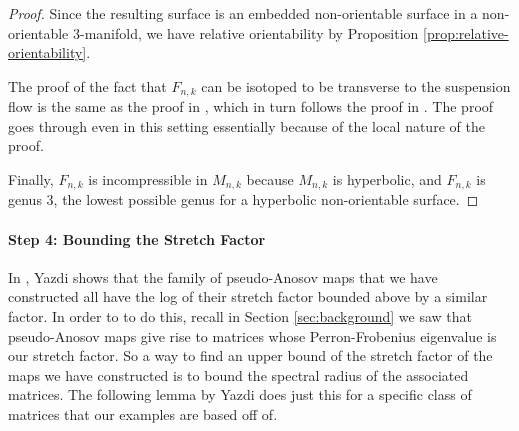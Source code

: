 \begin{proof}
  Since the resulting surface is an embedded non-orientable surface in a non-orientable $3$-manifold, we have
  relative orientability by Proposition \ref{prop:relative-orientability}.

  The proof of the fact that $F_{n,k}$ can be isotoped to be transverse to the suspension flow is the same as the
  proof in \cite{yazdi2018pseudo}, which in turn follows the proof in \cite{leininger2013number}. The proof goes
  through even in this setting essentially because of the local nature of the proof.

  Finally, $F_{n,k}$ is incompressible in $M_{n,k}$ because $M_{n,k}$ is hyperbolic, and $F_{n,k}$ is genus $3$, the
  lowest possible genus for a hyperbolic non-orientable surface.
\end{proof}

\paragraph{Step 4: Bounding the Stretch Factor}

In \cite{yazdi2018pseudo}, Yazdi shows that the family of pseudo-Anosov maps that we have constructed all have
the log of their stretch factor bounded above by a similar factor. In order to to do this, recall in Section
\ref{sec:background} we saw that pseudo-Anosov maps give rise to matrices whose Perron-Frobenius eigenvalue is
our stretch factor. So a way to find an upper bound of the stretch factor of the maps we have constructed is
to bound the spectral radius of the associated matrices. The following lemma by Yazdi does just this for a
specific class of matrices that our examples are based off of.

